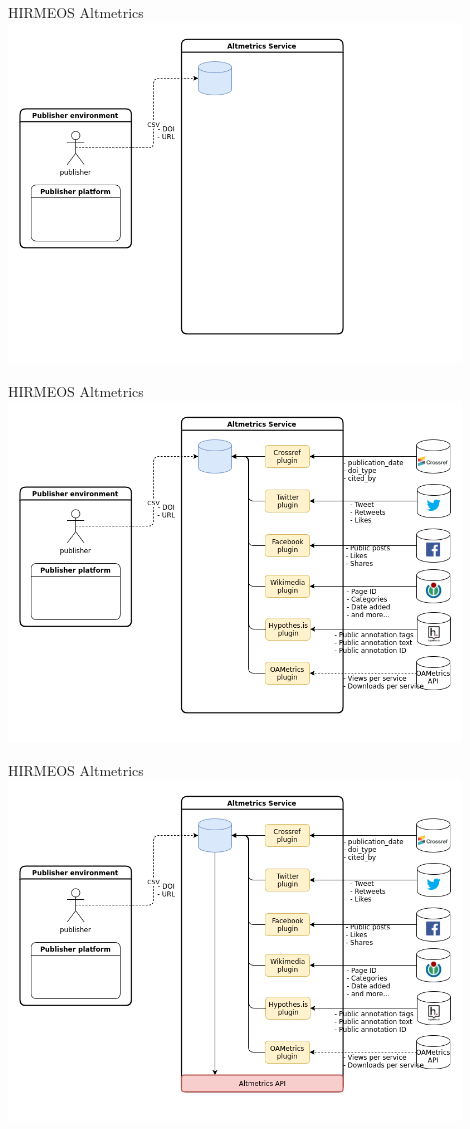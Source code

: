 \documentclass[xcolor=svgnames]{beamer}
\begin{document}
        \begin{frame}{HIRMEOS Altmetrics}
            \includegraphics[width=0.9\textwidth]{img/h2}
        \end{frame}

        \begin{frame}{HIRMEOS Altmetrics}
            \includegraphics[width=0.9\textwidth]{img/h3}
        \end{frame}

        \begin{frame}{HIRMEOS Altmetrics}
            \includegraphics[width=0.9\textwidth]{img/h4}
        \end{frame}
\end{document}
